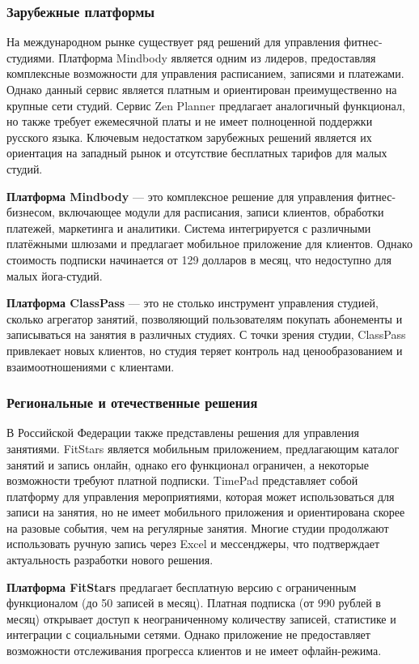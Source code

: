 \subsubsection{Зарубежные платформы}

На международном рынке существует ряд решений для управления фитнес-студиями. Платформа Mindbody является одним из лидеров, предоставляя комплексные возможности для управления расписанием, записями и платежами. Однако данный сервис является платным и ориентирован преимущественно на крупные сети студий. Сервис Zen Planner предлагает аналогичный функционал, но также требует ежемесячной платы и не имеет полноценной поддержки русского языка. Ключевым недостатком зарубежных решений является их ориентация на западный рынок и отсутствие бесплатных тарифов для малых студий.

\textbf{Платформа Mindbody} — это комплексное решение для управления фитнес-бизнесом, включающее модули для расписания, записи клиентов, обработки платежей, маркетинга и аналитики. Система интегрируется с различными платёжными шлюзами и предлагает мобильное приложение для клиентов. Однако стоимость подписки начинается от 129 долларов в месяц, что недоступно для малых йога-студий.

\textbf{Платформа ClassPass} — это не столько инструмент управления студией, сколько агрегатор занятий, позволяющий пользователям покупать абонементы и записываться на занятия в различных студиях. С точки зрения студии, ClassPass привлекает новых клиентов, но студия теряет контроль над ценообразованием и взаимоотношениями с клиентами.

\subsubsection{Региональные и отечественные решения}

В Российской Федерации также представлены решения для управления занятиями. FitStars является мобильным приложением, предлагающим каталог занятий и запись онлайн, однако его функционал ограничен, а некоторые возможности требуют платной подписки. TimePad представляет собой платформу для управления мероприятиями, которая может использоваться для записи на занятия, но не имеет мобильного приложения и ориентирована скорее на разовые события, чем на регулярные занятия. Многие студии продолжают использовать ручную запись через Excel и мессенджеры, что подтверждает актуальность разработки нового решения.

\textbf{Платформа FitStars} предлагает бесплатную версию с ограниченным функционалом (до 50 записей в месяц). Платная подписка (от 990 рублей в месяц) открывает доступ к неограниченному количеству записей, статистике и интеграции с социальными сетями. Однако приложение не предоставляет возможности отслеживания прогресса клиентов и не имеет офлайн-режима.


